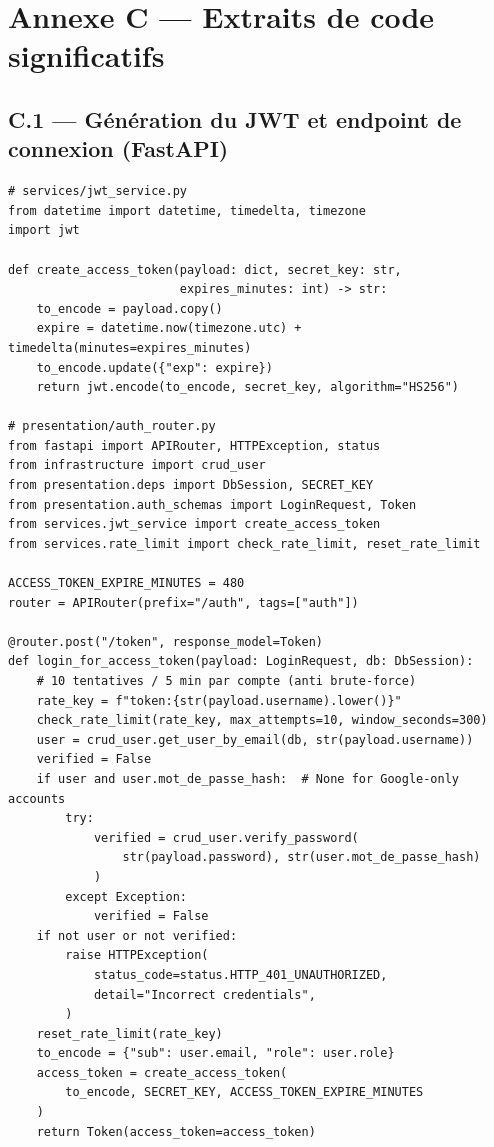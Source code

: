 \documentclass[12pt, a4paper]{report}
\renewcommand{\_}{\origunderscore\allowbreak}
\begin{document}
\section*{Annexe C — Extraits de code significatifs}

\subsection*{C.1 — Génération du JWT et endpoint de connexion (FastAPI)}

\begin{lstlisting}[style=pythonstyle, caption={Service JWT (HS256) et endpoint POST /auth/token}, label={lst:auth}]
# services/jwt_service.py
from datetime import datetime, timedelta, timezone
import jwt

def create_access_token(payload: dict, secret_key: str,
                        expires_minutes: int) -> str:
    to_encode = payload.copy()
    expire = datetime.now(timezone.utc) + timedelta(minutes=expires_minutes)
    to_encode.update({"exp": expire})
    return jwt.encode(to_encode, secret_key, algorithm="HS256")

# presentation/auth_router.py
from fastapi import APIRouter, HTTPException, status
from infrastructure import crud_user
from presentation.deps import DbSession, SECRET_KEY
from presentation.auth_schemas import LoginRequest, Token
from services.jwt_service import create_access_token
from services.rate_limit import check_rate_limit, reset_rate_limit

ACCESS_TOKEN_EXPIRE_MINUTES = 480
router = APIRouter(prefix="/auth", tags=["auth"])

@router.post("/token", response_model=Token)
def login_for_access_token(payload: LoginRequest, db: DbSession):
    # 10 tentatives / 5 min par compte (anti brute-force)
    rate_key = f"token:{str(payload.username).lower()}"
    check_rate_limit(rate_key, max_attempts=10, window_seconds=300)
    user = crud_user.get_user_by_email(db, str(payload.username))
    verified = False
    if user and user.mot_de_passe_hash:  # None for Google-only accounts
        try:
            verified = crud_user.verify_password(
                str(payload.password), str(user.mot_de_passe_hash)
            )
        except Exception:
            verified = False
    if not user or not verified:
        raise HTTPException(
            status_code=status.HTTP_401_UNAUTHORIZED,
            detail="Incorrect credentials",
        )
    reset_rate_limit(rate_key)
    to_encode = {"sub": user.email, "role": user.role}
    access_token = create_access_token(
        to_encode, SECRET_KEY, ACCESS_TOKEN_EXPIRE_MINUTES
    )
    return Token(access_token=access_token)
\end{lstlisting}
\end{document}
